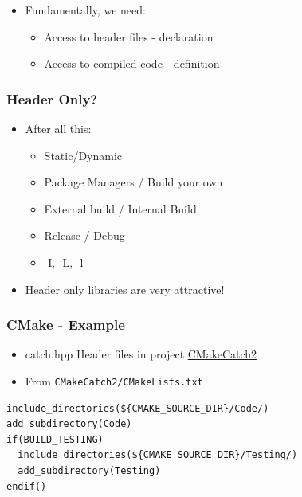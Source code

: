 \begin{itemize}
\itemsep1pt\parskip0pt
\item
  Fundamentally, we need:

  \begin{itemize}
  \itemsep1pt\parskip0pt
  \item
    Access to header files - declaration
  \item
    Access to compiled code - definition
  \end{itemize}
\end{itemize}

\subsubsection{Header Only?}\label{header-only}

\begin{itemize}
\itemsep1pt\parskip0pt
\item
  After all this:

  \begin{itemize}
  \itemsep1pt\parskip0pt
  \item
    Static/Dynamic
  \item
    Package Managers / Build your own
  \item
    External build / Internal Build
  \item
    Release / Debug
  \item
    -I, -L, -l
  \end{itemize}
\item
  Header only libraries are very attractive!
\end{itemize}

\subsubsection{CMake - Example}\label{cmake---example}

\begin{itemize}
\itemsep1pt\parskip0pt
\item
  catch.hpp Header files in project
  \href{https://github.com/MattClarkson/CMakeCatch2}{CMakeCatch2}
\item
  From \texttt{CMakeCatch2/CMakeLists.txt}
\end{itemize}

\begin{verbatim}
include_directories(${CMAKE_SOURCE_DIR}/Code/)
add_subdirectory(Code)
if(BUILD_TESTING)
  include_directories(${CMAKE_SOURCE_DIR}/Testing/)
  add_subdirectory(Testing)
endif()
\end{verbatim}

